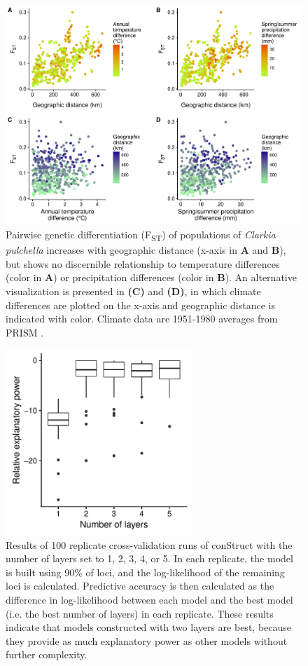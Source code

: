 \documentclass{article}
\begin{document}
\begin{figure}[ht]
\centering
\includegraphics[width=\textwidth]{figs/fst_clim_dist.pdf}
\caption[Pairwise genetic differentiation vs. geographic distance]{Pairwise genetic differentiation (F\textsubscript{ST}) of populations of \textit{Clarkia pulchella} increases with geographic distance (x-axis in \textbf{A} and \textbf{B}), but shows no discernible relationship to temperature differences (color in \textbf{A}) or precipitation differences (color in \textbf{B}). An alternative visualization is presented in \textbf{(C)} and \textbf{(D)}, in which climate differences are plotted on the x-axis and geographic distance is indicated with color. Climate data are 1951-1980 averages from PRISM \citep{PRISM}.}
\label{fst_main_popgen}
\end{figure}

\begin{figure}[ht]
\centering
\includegraphics[width=7cm]{figs/xval_results.pdf}
\caption[Results of conStruct cross validation]{Results of 100 replicate cross-validation runs of conStruct with the number of layers set to 1, 2, 3, 4, or 5. In each replicate, the model is built using 90\% of loci, and the log-likelihood of the remaining loci is calculated. Predictive accuracy is then calculated as the difference in log-likelihood between each model and the best model (i.e. the best number of layers) in each replicate. These results indicate that models constructed with two layers are best, because they provide as much explanatory power as other models without further complexity.}
\label{construct_xval}
\end{figure}
\end{document}
